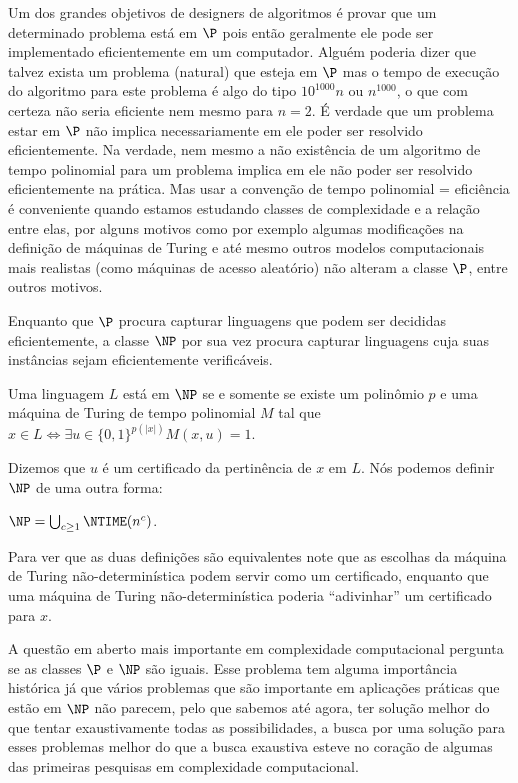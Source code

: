 Um dos grandes objetivos de designers de algoritmos é provar que um determinado problema está em $\P$ pois então geralmente ele pode ser implementado eficientemente em um computador. Alguém poderia dizer que talvez exista um problema (natural) que esteja em $\P$ mas o tempo de execução do algoritmo para este problema é algo do tipo $10^{1000}n$ ou $n^{1000}$, o que com certeza não seria eficiente nem mesmo para $n = 2$. É verdade que um problema estar em $\P$ não implica necessariamente em ele poder ser resolvido eficientemente. Na verdade, nem mesmo a não existência de um algoritmo de tempo polinomial para um problema implica em ele não poder ser resolvido eficientemente na prática. Mas usar a convenção de tempo polinomial = eficiência é conveniente quando estamos estudando classes de complexidade e a relação entre elas, por alguns motivos como por exemplo algumas modificações na definição de máquinas de Turing e até mesmo outros modelos computacionais mais realistas (como máquinas de acesso aleatório) não alteram a classe $\P$, entre outros motivos.


Enquanto que $\P$ procura capturar linguagens que podem ser decididas eficientemente, a classe $\NP$ por sua vez procura capturar linguagens cuja suas instâncias sejam eficientemente verificáveis.

\begin{defi} [A classe $\NP$]

Uma linguagem $L$ está em $\NP$ se e somente se existe um polinômio $p$ e uma máquina de Turing de tempo polinomial $M$ tal que $x \in L \iff \exists u \in \{0, 1\}^{p(\lvert x \rvert)} M(x, u) = 1$. 

\end{defi}

Dizemos que $u$ é um certificado da pertinência de $x$ em $L$. Nós podemos definir $\NP$ de uma outra forma:

\begin{defi}

$\NP = \bigcup_{c \geq 1} \NTIME(n^{c})$.

\end{defi}

Para ver que as duas definições são equivalentes note que as escolhas da máquina de Turing não-determinística podem servir como um certificado, enquanto que uma máquina de Turing não-determinística poderia ``adivinhar'' um certificado para $x$.



A questão em aberto mais importante em complexidade computacional pergunta se as classes $\P$ e $\NP$ são iguais. Esse problema tem alguma importância histórica já que vários problemas que são importante em aplicações práticas que estão em $\NP$ não parecem, pelo que sabemos até agora, ter solução melhor do que tentar exaustivamente todas as possibilidades, a busca por uma solução para esses problemas melhor do que a busca exaustiva esteve no coração de algumas das primeiras pesquisas em complexidade computacional.

